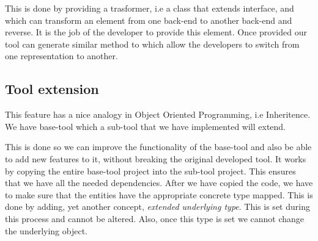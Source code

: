         This is done by providing a trasformer, i.e a class that extends  interface, and which can transform an element from one back-end to another back-end and reverse. It is the job
of the developer to provide this element. Once provided our tool can generate similar method to  which allow the developers to switch from one representation to another.

\subsection{Tool extension}

	This feature has a nice analogy in Object Oriented Programming, i.e Inheritence. We have base-tool which a sub-tool that we have implemented will extend. 

	This is done so we can improve the functionality of the base-tool and also be able to add new features to it, without breaking the original developed tool. It works by copying the 
entire base-tool project into the sub-tool project. This ensures that we have all the needed dependencies. After we have copied the code, we have to make sure that the entities have the 
appropriate concrete type mapped. This is done by adding, yet another concept, \textit{extended underlying type}. This is set during this process and cannot be altered. Also, once this
type is set we cannot change the underlying object.
        

